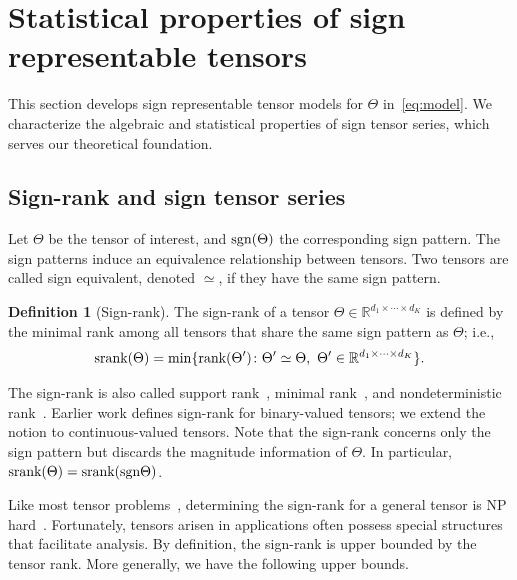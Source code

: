 \documentclass[useAMS,usenatbib,usegraphicx,referee]{biom}
\theoremstyle{plain}
\theoremstyle{definition}
\newtheorem{defn}{Definition}
\def\sign{\textup{sgn}}
\def\srank{\textup{srank}}
\def\rank{\textup{rank}}
\begin{document}
\vspace{-.3cm}

\section{Statistical properties of sign representable tensors}\label{sec:representation}
This section develops sign representable tensor models for $\Theta$ in~\eqref{eq:model}. We characterize the algebraic and statistical properties of sign tensor series, which serves our theoretical foundation. 

\vspace{-.2cm}

\subsection{Sign-rank and sign tensor series}\label{sec:sign-rank}
Let $\Theta$ be the tensor of interest, and $\sign (\Theta)$ the corresponding sign pattern. The sign patterns induce an equivalence relationship between tensors. Two tensors are called sign equivalent, denoted $\simeq$, if they have the same sign pattern.

\vspace{-.3cm}

\begin{defn}[Sign-rank]
The sign-rank of a tensor $\Theta\in\mathbb{R}^{d_1\times \cdots \times d_K}$ is defined by the minimal rank among all tensors that share the same sign pattern as $\Theta$; i.e.,
\[
\srank(\Theta) = \min \{\rank(\Theta')\colon  \Theta'\simeq \Theta,\ \Theta'\in\mathbb{R}^{d_1\times \cdots \times d_K}\}.
\]
\end{defn}
The sign-rank is also called support rank~\citep{cohn2013fast}, minimal rank~\citep{alon2016sign}, and nondeterministic rank~\citep{de2003nondeterministic}. Earlier work defines sign-rank for binary-valued tensors; we extend the notion to continuous-valued tensors. Note that the sign-rank concerns only the sign pattern but discards the magnitude information of $\Theta$. In particular, $\srank(\Theta)=\srank(\sign \Theta)$. 

Like most tensor problems~\citep{hillar2013most}, determining the sign-rank for a general tensor is NP hard~\citep{alon2016sign}. Fortunately, tensors arisen in applications often possess special structures that facilitate analysis. By definition, the sign-rank is upper bounded by the tensor rank. More generally, we have the following upper bounds. 

\vspace{-.3cm}
\end{document}
